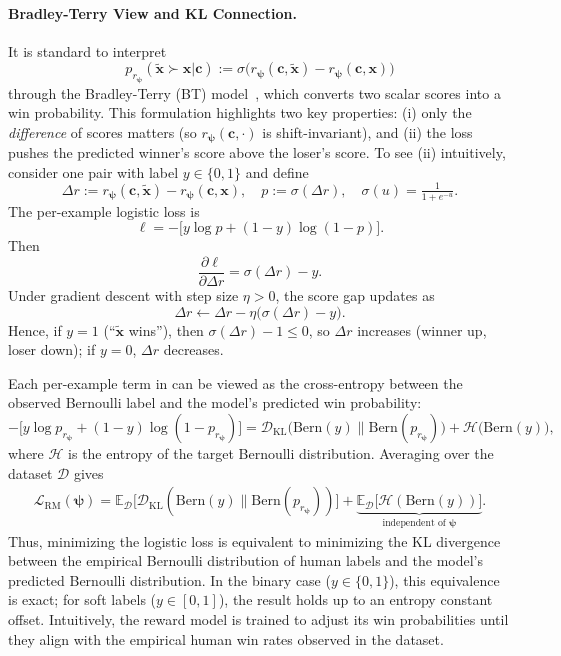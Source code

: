 \paragraph{Bradley-Terry View and KL Connection.}
It is standard to interpret
\[
p_{r_{\bm\psi}}(\tilde{\mathbf x}\succ \mathbf x|\mathbf c)
:= \sigma \big(r_{\bm\psi}(\mathbf c,\tilde{\mathbf x})-r_{\bm\psi}(\mathbf c,\mathbf x)\big)
\]
through the Bradley-Terry (BT) model~\citep{bradley1952rank}, which converts two scalar scores into a win probability.  
This formulation highlights two key properties: (i) only the \emph{difference} of scores matters (so $r_{\bm\psi}(\mathbf c,\cdot)$ is shift-invariant), and (ii) the loss pushes the predicted winner’s score above the loser’s score. To see (ii) intuitively, consider one pair with label $y\in\{0,1\}$ and define
\[
\Delta r := r_{\bm\psi}(\mathbf c,\tilde{\mathbf x})-r_{\bm\psi}(\mathbf c,\mathbf x),
\quad
p:=\sigma(\Delta r),\quad \sigma(u)=\tfrac{1}{1+e^{-u}}.
\]
The per-example logistic loss is
\[
\ell=-\big[y\log p+(1-y)\log(1-p)\big].
\]
Then
\[
\frac{\partial \ell}{\partial \Delta r}=\sigma(\Delta r)-y.
\]
Under gradient descent with step size $\eta>0$, the score gap updates as
\[
\Delta r \leftarrow \Delta r-\eta\big(\sigma(\Delta r)-y\big).
\]
Hence, if $y=1$ (``$\tilde{\mathbf x}$ wins''), then $\sigma(\Delta r)-1\le 0$, so $\Delta r$ increases (winner up, loser down); if $y=0$, $\Delta r$ decreases.


Each per-example term in  can be viewed as the cross-entropy between the observed Bernoulli label and the model’s predicted win probability:
\[
-\big[y\log p_{r_{\bm\psi}}+(1-y)\log(1-p_{r_{\bm\psi}})\big]
= \mathcal D_{\mathrm{KL}} \big(\mathrm{Bern}(y) \big\| \mathrm{Bern}(p_{r_{\bm\psi}})\big)
+ \mathcal H \big(\mathrm{Bern}(y)\big),
\]
where $\mathcal H$ is the entropy of the target Bernoulli distribution.
Averaging over the dataset $\mathcal D$ gives
\begin{align}\label{eq:reward_loss}
    \mathcal L_{\mathrm{RM}}(\bm\psi)
= \mathbb E_{\mathcal D} \Big[\mathcal D_{\mathrm{KL}}\left(\mathrm{Bern}(y) \big\| \mathrm{Bern}(p_{r_{\bm\psi}})\right)\Big]
+ \underbrace{\mathbb E_{\mathcal D} \big[\mathcal H(\mathrm{Bern}(y))\big]}_{\text{independent of }\bm\psi}.
\end{align}
Thus, minimizing the logistic loss is equivalent to minimizing the KL divergence between the empirical Bernoulli distribution of human labels and the model’s predicted Bernoulli distribution. In the binary case ($y\in\{0,1\}$), this equivalence is exact; for soft labels ($y\in[0,1]$), the result holds up to an entropy constant offset. Intuitively, the reward model is trained to adjust its win probabilities until they align with the empirical human win rates observed in the dataset.


